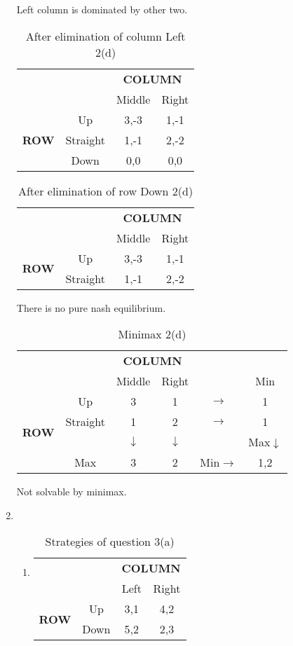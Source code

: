 \documentclass[a4paper,12pt]{article}
\begin{document}
\begin{enumerate}
Left column is dominated by other two.

\begin{table}[H]
\centering
\begin{tabular}{@{}cccc@{}}
\toprule
& & \multicolumn{2}{c}{\bfseries COLUMN}\\
& & Middle & Right\\
\multirow{3}{*}{\bfseries ROW} & Up & 3,-3 & 1,-1\\
 & Straight & 1,-1 & 2,-2\\
 & Down & 0,0 & 0,0\\
\bottomrule
\end{tabular}
\caption{After elimination of column Left 2(d)}
\end{table}

\begin{table}[H]
\centering
\begin{tabular}{@{}cccc@{}}
\toprule
& & \multicolumn{2}{c}{\bfseries COLUMN}\\
& & Middle & Right\\
\multirow{2}{*}{\bfseries ROW} & Up & 3,-3 & 1,-1\\
 & Straight & 1,-1 & 2,-2\\
\bottomrule
\end{tabular}
\caption{After elimination of row Down 2(d)}
\end{table}

There is no pure nash equilibrium.
\begin{table}[H]
\centering
\begin{tabular}{@{}cccccc@{}}
\toprule
& & \multicolumn{2}{c}{\bfseries COLUMN}\\
& & Middle & Right && Min\\
\multirow{4}{*}{\bfseries ROW} & Up & 3 & 1 &$\rightarrow$&1\\
 & Straight & 1 & 2&$\rightarrow$&1\\
 & & $\downarrow$ & $\downarrow$ && Max$\downarrow$\\
 & Max & 3 & 2 & Min$\rightarrow$ & 1,2\\
\bottomrule
\end{tabular}
\caption{Minimax 2(d)}
\end{table}

Not solvable by minimax.

\item%
\begin{enumerate}
\item
\begin{table}[H]
\centering
\begin{tabular}{@{}cccc@{}}
\toprule
& & \multicolumn{2}{c}{\bfseries COLUMN}\\
& & Left & Right\\
\multirow{2}{*}{\bfseries ROW} & Up & 3,1 & 4,2\\
 & Down & 5,2 & 2,3\\
\bottomrule
\end{tabular}
\caption{Strategies of question 3(a)}
\end{table}


\end{enumerate}
\end{enumerate}
\end{document}
